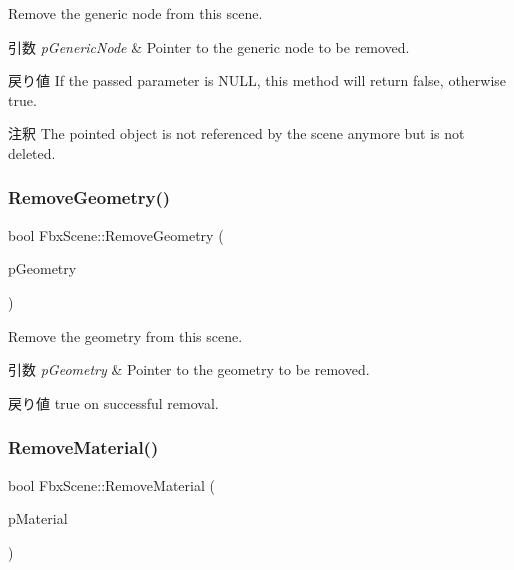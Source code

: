 Remove the generic node from this scene. 
\begin{DoxyParams}{引数}
{\em p\+Generic\+Node} & Pointer to the generic node to be removed. \\
\hline
\end{DoxyParams}
\begin{DoxyReturn}{戻り値}
If the passed parameter is {\ttfamily N\+U\+LL}, this method will return {\ttfamily false}, otherwise {\ttfamily true}. 
\end{DoxyReturn}
\begin{DoxyRemark}{注釈}
The pointed object is not referenced by the scene anymore but is not deleted. 
\end{DoxyRemark}
\mbox{\label{class_fbx_scene_a9bbff92d4739c1a39489c8b9178e51b4}} 
\subsubsection{\texorpdfstring{Remove\+Geometry()}{RemoveGeometry()}}
{\footnotesize\ttfamily bool Fbx\+Scene\+::\+Remove\+Geometry (\begin{DoxyParamCaption}\item[{\hyperlink{class_fbx_geometry}{Fbx\+Geometry} $\ast$}]{p\+Geometry }\end{DoxyParamCaption})}

Remove the geometry from this scene. 
\begin{DoxyParams}{引数}
{\em p\+Geometry} & Pointer to the geometry to be removed. \\
\hline
\end{DoxyParams}
\begin{DoxyReturn}{戻り値}
true on successful removal. 
\end{DoxyReturn}
\mbox{\label{class_fbx_scene_a901ad0c4394b3ee5bf675ee91e54adc0}} 
\subsubsection{\texorpdfstring{Remove\+Material()}{RemoveMaterial()}}
{\footnotesize\ttfamily bool Fbx\+Scene\+::\+Remove\+Material (\begin{DoxyParamCaption}\item[{\hyperlink{class_fbx_surface_material}{Fbx\+Surface\+Material} $\ast$}]{p\+Material }\end{DoxyParamCaption})}

